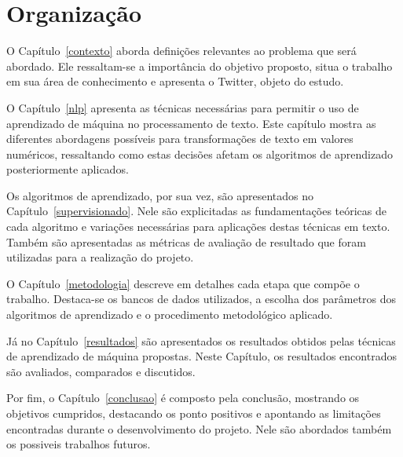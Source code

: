 \section{Organização}

O Capítulo~\ref{contexto} aborda definições relevantes ao problema que será abordado.
Ele ressaltam-se a importância do objetivo proposto, situa o trabalho em sua área de conhecimento e apresenta o Twitter,
objeto do estudo.

O Capítulo~\ref{nlp} apresenta as técnicas necessárias para permitir o uso de aprendizado de máquina no processamento de
texto.
Este capítulo mostra as diferentes abordagens possíveis para transformações de texto em valores numéricos, ressaltando
como estas decisões afetam os algoritmos de aprendizado posteriormente aplicados.

Os algoritmos de aprendizado, por sua vez, são apresentados no Capítulo~\ref{supervisionado}.
Nele são explicitadas as fundamentações teóricas de cada algoritmo e variações necessárias para aplicações destas
técnicas em texto.
Também são apresentadas as métricas de avaliação de resultado que foram utilizadas para a realização do projeto.

O Capítulo~\ref{metodologia} descreve em detalhes cada etapa que compõe o trabalho.
Destaca-se os bancos de dados utilizados, a escolha dos parâmetros dos algoritmos de aprendizado e o procedimento
metodológico aplicado.

Já no Capítulo~\ref{resultados} são apresentados os resultados obtidos pelas técnicas de aprendizado de máquina propostas.
Neste Capítulo, os resultados encontrados são avaliados, comparados e discutidos.

Por fim, o Capítulo~\ref{conclusao} é composto pela conclusão, mostrando os objetivos cumpridos, destacando os ponto
positivos e apontando as limitações encontradas durante o desenvolvimento do projeto.
Nele são abordados também os possiveis trabalhos futuros.

